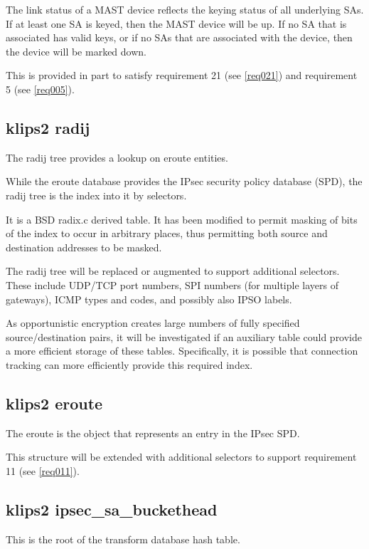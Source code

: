 The link status of a MAST device reflects the keying status of all underlying 
SAs. If at least one SA is keyed, then the MAST device will be up. If no SA
that is associated has valid keys, or if no SAs that are associated with the
device, then the device will be marked down.

This is provided in part to satisfy requirement 21 (see \ref{req021})
and requirement 5 (see \ref{req005}).

\subsection{klips2 radij}

The radij tree provides a lookup on eroute entities.  

While the eroute database provides the IPsec security policy database (SPD),
the radij tree is the index into it by selectors.

It is a BSD radix.c derived table. It has been modified to permit masking of
bits of the index to occur in arbitrary places, thus permitting both source
and destination addresses to be masked.

The radij tree will be replaced or augmented to support additional selectors.
These include UDP/TCP port numbers, SPI numbers (for multiple layers of
gateways), ICMP types and codes, and possibly also IPSO labels.

As opportunistic encryption creates large numbers of fully specified
source/destination pairs, it will be investigated if an auxiliary table could
provide a more efficient storage of these tables. Specifically, it is
possible that connection tracking can more efficiently provide this required
index. 

\subsection{klips2 eroute}

The eroute is the object that represents an entry in the IPsec SPD.

This structure will be extended with additional selectors to support
requirement 11 (see \ref{req011}).

\subsection{klips2 ipsec\_sa\_buckethead}

This is the root of the transform database hash table. 

